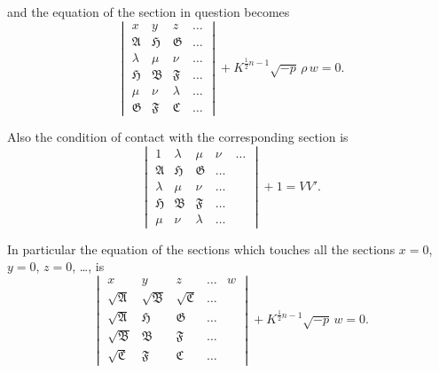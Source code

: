 \documentclass[11pt,a4paper]{book}
\begin{document}
\newpage
\setcounter{page}{85}

and the equation of the section in question becomes
\[
\begin{vmatrix}
x & y & z & \ldots \\
\mathfrak{A} & \mathfrak{H} & \mathfrak{G} & \ldots \\
\lambda & \mu & \nu & \ldots \\
\mathfrak{H} & \mathfrak{B} & \mathfrak{F} & \ldots \\
\mu & \nu & \lambda & \ldots \\
\mathfrak{G} & \mathfrak{F} & \mathfrak{C} & \ldots
\end{vmatrix}
+ K^{\frac{1}{2}n-1}\sqrt{-p}\,\rho\,w = 0.
\]

Also the condition of contact with the corresponding section is
\[
\begin{vmatrix}
1 & \lambda & \mu & \nu & \ldots \\
\mathfrak{A} & \mathfrak{H} & \mathfrak{G} & \ldots \\
\lambda & \mu & \nu & \ldots \\
\mathfrak{H} & \mathfrak{B} & \mathfrak{F} & \ldots \\
\mu & \nu & \lambda & \ldots
\end{vmatrix}
+ 1 = VV'.
\]

In particular the equation of the sections which touches all the sections $x=0$, $y=0$, $z=0$, \ldots, is
\[
\begin{vmatrix}
x & y & z & \ldots & w \\
\sqrt{\mathfrak{A}} & \sqrt{\mathfrak{B}} & \sqrt{\mathfrak{C}} & \ldots \\
\sqrt{\mathfrak{A}} & \mathfrak{H} & \mathfrak{G} & \ldots \\
\sqrt{\mathfrak{B}} & \mathfrak{B} & \mathfrak{F} & \ldots \\
\sqrt{\mathfrak{C}} & \mathfrak{F} & \mathfrak{C} & \ldots
\end{vmatrix}
+ K^{\frac{1}{2}n-1}\sqrt{-p}\,w = 0.
\]
\end{document}
